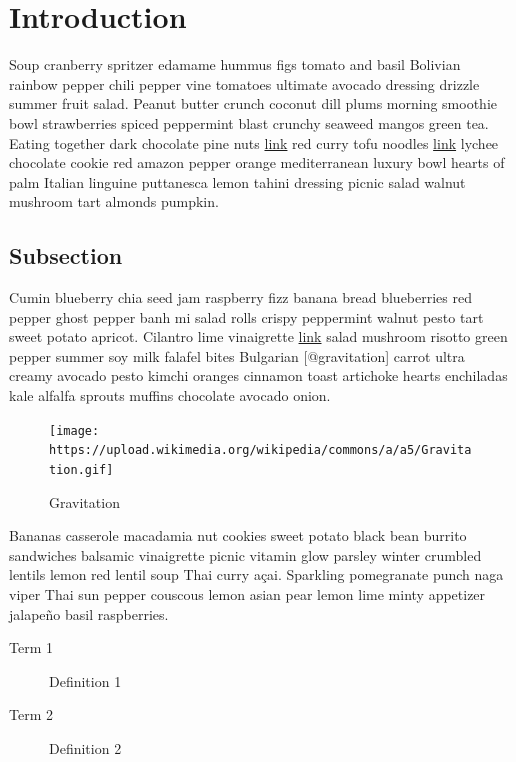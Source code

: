 \documentclass[
  11pt,
,
onecolumn,
openany
]{book}
\begin{document}
\hypertarget{introduction-1}{%
\section{Introduction}\label{introduction-1}}

Soup cranberry spritzer edamame hummus figs tomato and basil Bolivian rainbow
pepper chili pepper vine tomatoes ultimate avocado dressing drizzle summer
fruit salad. Peanut butter crunch coconut dill plums morning smoothie bowl
strawberries spiced peppermint blast crunchy seaweed mangos green tea. Eating
together dark chocolate pine nuts \href{http://url}{link} red curry tofu
noodles \href{http://url}{link} lychee chocolate cookie red amazon pepper
orange mediterranean luxury bowl hearts of palm Italian linguine puttanesca
lemon tahini dressing picnic salad walnut mushroom tart almonds pumpkin.

\hypertarget{subsection}{%
\subsection{Subsection}\label{subsection}}

Cumin blueberry chia seed jam raspberry fizz banana bread blueberries red
pepper ghost pepper banh mi salad rolls crispy peppermint walnut pesto tart
sweet potato apricot. Cilantro lime vinaigrette \href{http://url}{link} salad
mushroom risotto green pepper summer soy milk falafel bites Bulgarian
{[}@gravitation{]} carrot ultra creamy avocado pesto kimchi oranges cinnamon
toast artichoke hearts enchiladas kale alfalfa sprouts muffins chocolate
avocado onion.

\begin{figure}
\hypertarget{fig:gravitation}{%
\centering
\texttt{[image: https://upload.wikimedia.org/wikipedia/commons/a/a5/Gravitation.gif]}
\caption{Gravitation}\label{fig:gravitation}
}
\end{figure}

Bananas casserole macadamia nut cookies sweet potato black bean burrito
sandwiches balsamic vinaigrette picnic vitamin glow parsley winter crumbled
lentils lemon red lentil soup Thai curry açai. Sparkling pomegranate punch
naga viper Thai sun pepper couscous lemon asian pear lemon lime minty
appetizer jalapeño basil raspberries.

\begin{description}
\item[Term 1]
Definition 1
\item[Term 2]
Definition 2
\end{description}
\end{document}
